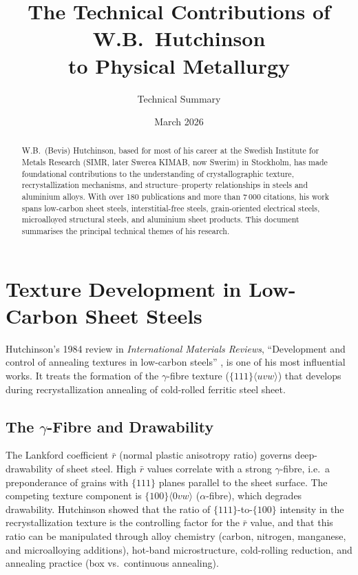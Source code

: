\documentclass[11pt,a4paper]{article}
\title{The Technical Contributions of W.B.\ Hutchinson \\
       to Physical Metallurgy}
\author{Technical Summary}
\date{March 2026}
\begin{document}
\maketitle

\begin{abstract}
W.B.\ (Bevis) Hutchinson, based for most of his career at the Swedish
Institute for Metals Research (SIMR, later Swerea KIMAB, now Swerim) in
Stockholm, has made foundational contributions to the understanding of
crystallographic texture, recrystallization mechanisms, and
structure--property relationships in steels and aluminium alloys.  With
over 180 publications and more than 7\,000 citations, his work spans
low-carbon sheet steels, interstitial-free steels, grain-oriented
electrical steels, microalloyed structural steels, and aluminium sheet
products.  This document summarises the principal technical themes of his
research.
\end{abstract}

\section{Texture Development in Low-Carbon Sheet Steels}
\label{sec:bcc-texture}

Hutchinson's 1984 review in \emph{International Materials Reviews},
``Development and control of annealing textures in low-carbon steels''
\cite{Hutchinson1984IMR}, is one of his most influential works.  It
treats the formation of the $\gamma$-fibre texture
($\{111\}\langle uvw\rangle$) that develops during recrystallization
annealing of cold-rolled ferritic steel sheet.

\subsection{The $\gamma$-Fibre and Drawability}

The Lankford coefficient $\bar{r}$ (normal plastic anisotropy ratio)
governs deep-drawability of sheet steel.  High $\bar{r}$ values
correlate with a strong $\gamma$-fibre, i.e.\ a preponderance of grains
with $\{111\}$ planes parallel to the sheet surface.  The competing
texture component is $\{100\}\langle 0vw\rangle$ ($\alpha$-fibre), which
degrades drawability.  Hutchinson showed that the ratio of
$\{111\}$-to-$\{100\}$ intensity in the recrystallization texture is the
controlling factor for the $\bar{r}$ value, and that this ratio can be
manipulated through alloy chemistry (carbon, nitrogen, manganese, and
microalloying additions), hot-band microstructure, cold-rolling
reduction, and annealing practice (box vs.\ continuous annealing).
\end{document}
